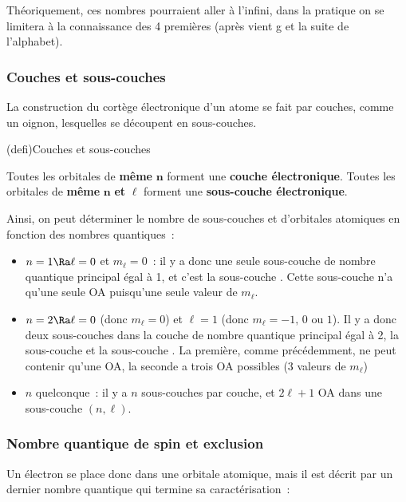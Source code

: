 \documentclass[../../main/main.tex]{subfiles}
\begin{document}
Théoriquement, ces nombres pourraient aller à l'infini, dans la pratique on se
limitera à la connaissance des 4 premières (après vient g et la suite de
l'alphabet).

\subsubsection{Couches et sous-couches}
La construction du cortège électronique d'un atome se fait par couches, comme un
oignon, lesquelles se découpent en sous-couches.

\begin{tcb*}(defi){Couches et sous-couches}
	\begin{center}
		Toutes les orbitales de \textbf{même} $\mathbf{n}$ forment une
		\textbf{couche électronique}. \smallbreak
		Toutes les orbitales de \textbf{même} $\mathbf{n}$ \textbf{et}
		$\mathbf{\ell}$ forment une \textbf{sous-couche électronique}.
	\end{center}
\end{tcb*}

Ainsi, on peut déterminer le nombre de sous-couches et d'orbitales atomiques en
fonction des nombres quantiques~:
\begin{itemize}
	\item $n = 1 \Ra \ell = 0$ et $m_\ell = 0$~: il y a donc une seule
	      sous-couche de nombre quantique principal égal à 1, et c'est la
	      sous-couche . Cette sous-couche n'a qu'une seule OA puisqu'une
	      seule valeur de $m_\ell$.
	\item $n = 2 \Ra \ell = 0$ (donc $m_\ell = 0$) et $\ell = 1$ (donc $m_\ell =
		      -1,\, 0$ ou $1$). Il y a donc deux sous-couches dans la couche de nombre
	      quantique principal égal à 2, la sous-couche  et la sous-couche
	      . La première, comme précédemment, ne peut contenir qu'une OA,
	      la seconde a trois OA possibles (3 valeurs de $m_\ell$)
	\item $n$ quelconque~: il y a $n$ sous-couches par couche, et $2\ell+1$ OA
	      dans une sous-couche $(n,\ell)$.
\end{itemize}

\subsubsection{Nombre quantique de spin et exclusion}
Un électron se place donc dans une orbitale atomique, mais il est décrit par un
dernier nombre quantique qui termine sa caractérisation~:
\end{document}
